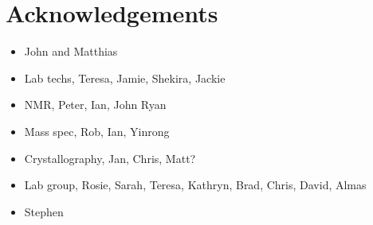 
\chapter*{Acknowledgements}
\label{ch:acknowledgements}

\begin{itemize}
\item{John and Matthias}
\item{Lab techs, Teresa, Jamie, Shekira, Jackie}
\item{NMR, Peter, Ian, John Ryan}
\item{Mass spec, Rob, Ian, Yinrong}
\item{Crystallography, Jan, Chris, Matt?}
\item{Lab group, Rosie, Sarah, Teresa, Kathryn, Brad, Chris, David, Almas}
\item{Stephen}
\end{itemize}
